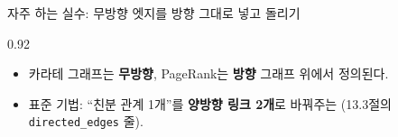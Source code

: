 \begin{frame}{자주 하는 실수: 무방향 엣지를 방향 그대로 넣고 돌리기}
\begin{center}\begin{varwidth}{0.92\textwidth}
  \begin{itemize}
    \item 카라테 그래프는 \textbf{무방향}, PageRank는
      \textbf{방향} 그래프 위에서 정의된다.
    \item 표준 기법: ``친분 관계 1개''를 \textbf{양방향 링크 2개}로
      바꿔주는  (13.3절의 \texttt{directed\_edges} 줄).
    
  \end{itemize}
\end{varwidth}\end{center}
\end{frame}
